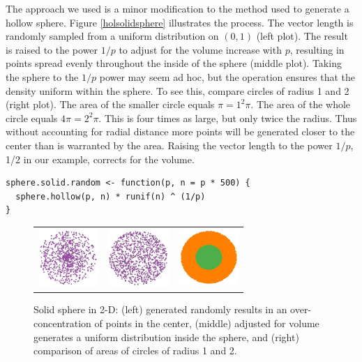 \documentclass[a4paper]{report}
\begin{document}
\begin{article}
The approach we used is a minor modification to the method used to
generate a hollow sphere. Figure \ref{holsolidsphere} illustrates the
process. The vector length is randomly sampled from a uniform
distribution on $(0,1)$ (left plot). The result is raised to the power
$1/p$ to adjust for the volume increase with $p$, resulting in points
spread evenly throughout the inside of the sphere (middle plot).
Taking the sphere to the $1/p$ power may seem ad hoc, but the
operation ensures that the density uniform within the sphere. To see
this, compare circles of radius 1 and 2 (right plot).  The area of the
smaller circle equals $\pi =  1^2\pi $.  The area of the whole
circle equals $ 4 \pi = 2^2 \pi $. This is four times as large, but
only twice the radius.  Thus without accounting for radial distance
more points will be generated closer to the center than is warranted
by the area.  Raising the vector length to the power $1/p$, 1/2 in our
example, corrects for the volume.

\begin{verbatim}
sphere.solid.random <- function(p, n = p * 500) {
  sphere.hollow(p, n) * runif(n) ^ (1/p)
}
\end{verbatim}

\begin{figure}[ht]
\centering
\begin{tabular}{c c c}
\includegraphics[width=0.9in]{sphere-2-bad.jpg} 
&\includegraphics[width=0.9in]{sphere-2-good.jpg} 
&\includegraphics[width=0.9in]{sphere-2-1and2.jpg}
\end{tabular}
\caption{Solid sphere in 2-D: (left) generated randomly results in an
  over-concentration of points in the center, (middle) adjusted for
  volume generates a uniform distribution inside the sphere, and
  (right) comparison of areas of circles of radius 1 and 2.}
\label{cfb}
\end{figure}


\end{article}
\end{document}
